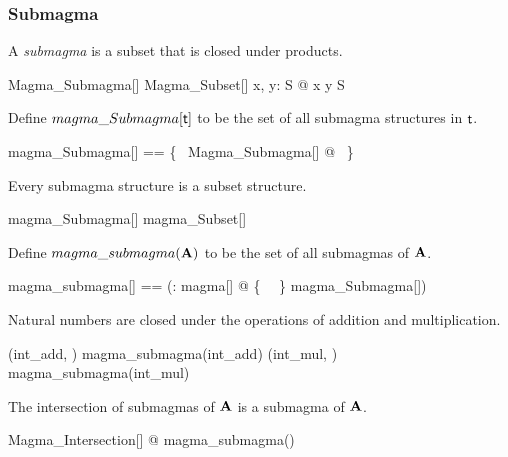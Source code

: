 \documentclass{amsart}
\begin{document}
\subsubsection{Submagma}

A \textit{submagma} is a subset that is closed under products.

\begin{schema}{Magma\_Submagma}[\genT]
	Magma\_Subset[\genT]
\where
	\forall x, y: S @ x \opG y \in S
\end{schema}

Define $magma\_Submagma[\mathsf{t}]$ to be the set of all submagma structures in $\mathsf{t}$.

\begin{zed}
	magma\_Submagma[\genT] == \{~ Magma\_Submagma[\genT] @ \strucS ~\}
\end{zed}

\begin{remark}
Every submagma structure is a subset structure.

\begin{zed}
	magma\_Submagma[\setT] \subseteq magma\_Subset[\setT]
\end{zed}

\end{remark}

Define $magma\_submagma(\mathbf{A})$ to be the set of all submagmas of $\mathbf{A}$.

\begin{zed}
	magma\_submagma[\genT] == (\lambda \strucA: magma[\genT] @ \{~ \strucA ~\} \dres magma\_Submagma[\genT])
\end{zed}

\begin{example}
Natural numbers are closed under the operations of addition and multiplication.

\begin{zed}
	(int\_add, \nat) \in magma\_submagma(int\_add)
\also
	(int\_mul, \nat) \in magma\_submagma(int\_mul)
\end{zed}

\end{example}

\begin{remark}
The intersection of submagmas of $\mathbf{A}$ is a submagma of $\mathbf{A}$.

\begin{zed}
 	\forall Magma\_Intersection[\setT] @ \strucS \in magma\_submagma(\strucA)
\end{zed}

\end{remark}
\end{document}
